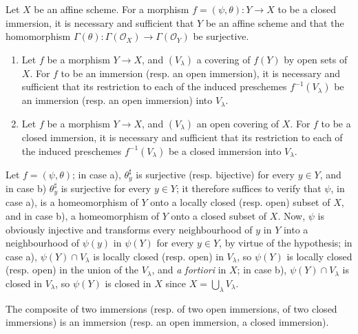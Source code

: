\begin{corollary}[4.2.3]
\label{I.4.2.3}
Let $X$ be an affine scheme. For a morphism
$f=(\psi,\theta):Y\to X$ to be a closed immersion, it is necessary and
sufficient that $Y$ be an affine scheme and that the homomorphism
$\Gamma(\theta):\Gamma(\mathscr{O}_X)\to\Gamma(\mathscr{O}_Y)$ be surjective.
\end{corollary}

\begin{corollary}[4.2.4]
\label{I.4.2.4}
\begin{enumerate}
  \item[a)] Let $f$ be a morphism $Y\to X$, and $(V_\lambda)$ a covering
  of $f(Y)$ by open sets of $X$. For $f$ to be an immersion (resp. an
  open immersion), it is necessary and sufficient
  that its restriction to each of the induced preschemes $f^{-1}(V_\lambda)$ be
  an immersion (resp. an open immersion) into $V_\lambda$.
  \item[b)] Let $f$ be a morphism $Y\to X$, and $(V_\lambda)$ an open covering
  of $X$. For $f$ to be a closed immersion, it is necessary and sufficient
  that its restriction to each of the induced preschemes $f^{-1}(V_\lambda)$ be
  a closed immersion into $V_\lambda$.
\end{enumerate}
\end{corollary}

Let $f=(\psi,\theta)$; in case a), $\theta_y^\sharp$ is surjective
(resp. bijective) for every $y\in Y$, and in case b) $\theta_y^\sharp$ is
surjective for every $y\in Y$; it therefore suffices to verify that $\psi$, in
case a), is a homeomorphism of $Y$ onto a locally closed (resp.
open) subset of $X$, and in case b), a homeomorphism of $Y$ onto a closed
subset of $X$. Now, $\psi$ is obviously injective and transforms every
neighbourhood of $y$ in $Y$ into a neighbourhood of $\psi(y)$ in $\psi(Y)$ for
every $y\in Y$, by virtue of the hypothesis; in case a), $\psi(Y)\cap V_\lambda$
is locally closed (resp. open) in $V_\lambda$, so $\psi(Y)$ is locally closed
(resp. open) in the union of the $V_\lambda$, and \emph{a fortiori} in $X$;
in case b), $\psi(Y)\cap V_\lambda$ is closed in $V_\lambda$, so
$\psi(Y)$ is closed in $X$ since $X=\bigcup_\lambda V_\lambda$.

\begin{proposition}[4.2.5]
\label{I.4.2.5}
The composite of two immersions (resp. of two open immersions, of two
closed immersions) is an immersion (resp. an open immersion, a
closed immersion).
\end{proposition}

